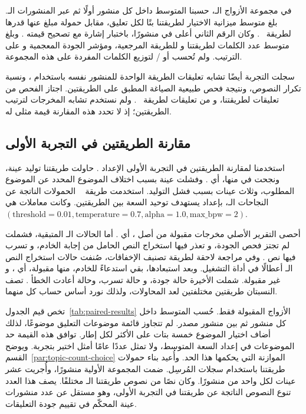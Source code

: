 في مجموعة الأزواج الـ، حسبنا المتوسط داخل كل منشور أولًا ثم عبر المنشورات الـ.
بلغ متوسط ميزانية الاختيار لطريقتنا  بتًا لكل تعليق، مقابل حمولة مبلغ عنها قدرها  لطريقة ~\cite{lin2024zero}.
وكان الرقم الثاني أعلى في  منشورًا، باختبار إشارة مع تصحيح  قيمته .
وبلغ متوسط عدد الكلمات  لطريقتنا و للطريقة المرجعية، ومؤشر الجودة المعجمية  و على الترتيب.
ولم تُحسب  أو / لتوزيع الكلمات المفردة على هذه المجموعة.

سجلت التجربة أيضًا تشابه تعليقات الطريقة الواحدة للمنشور نفسه باستخدام ، ونسبة تكرار النصوص، ونتيجة فحص طبيعية الصياغة المطبق على الطريقتين.
اجتاز الفحص  من  تعليقات لطريقتنا، و من  تعليقات لطريقة ~\cite{lin2024zero}.
ولم نستخدم تشابه المخرجات لترتيب الطريقتين؛ إذ لا تحدد هذه المقارنة قيمة مثلى له.

\subsection{مقارنة الطريقتين في التجربة الأولى}
استخدمنا لمقارنة الطريقتين في التجربة الأولى الإعداد .
حاولت طريقتنا توليد  عينة، ونجحت في  منها، أي .
وفشلت  عينة بسبب اختلاف الموضوع المحدد عن الموضوع المطلوب، وثلاث عينات بسبب فشل التوليد.
استخدمت طريقة ~\cite{lin2024zero} الحمولات الناتجة عن النجاحات الـ، بإعداد يستهدف توحيد السعة بين الطريقتين.
وكانت معاملات  هي $(\text{threshold}=0.01,\text{temperature}=0.7,\text{alpha}=1.0,\text{max\_bpw}=2)$.

أحصى التقرير الأصلي  مخرجات مقبولة من أصل ، أي .
أما الحالات الـ المتبقية، فشملت  لم تجتز فحص الجودة، و تعذر فيها استخراج النص الحامل من إجابة الخادم، و تسرب فيها نص .
وفي مراجعة لاحقة لطريقة تصنيف الإخفاقات، صُنفت حالات استخراج النص الـ أعطالًا في أداة التشغيل.
وبعد استبعادها، بقي  استدعاءً للخادم، منها  مقبولة، أي ، و غير مقبولة.
شملت الأخيرة  حالة جودة، و حالة تسرب، وحالة أعادت الخطأ .
تصف النسبتان طريقتين مختلفتين لعد المحاولات، ولذلك نورد أساس حساب كل منهما.

تخص قيم الجدول~\ref{tab:paired-results} الأزواج المقبولة فقط. حُسب المتوسط داخل كل منشور ثم بين  منشور مصدر.
لم تتجاوز قائمة موضوعات التعليق  موضوعًا، لذلك أضاف اختيار الموضوع خمسة بتات على الأكثر لكل إطار.
توافق هذه القيمة حد الموضوعات في إعداد السعة المتوسط، ولا تمثل عددًا عامًا أمثل اختير بتجربة. ويوضح القسم~\ref{par:topic-count-choice} الموازنة التي يحكمها هذا الحد.
وأُعيد بناء حمولات طريقتنا باستخدام سجلات المُرسِل.
ضمت المجموعة الأولية  منشورًا، وأُجريت عشر عينات لكل واحد من  منشورًا.
وكان  نصًا من نصوص طريقتنا الـ مختلفًا. يصف هذا العدد تنوع النصوص الناتجة عن طريقتنا في التجربة الأولى، وهو مستقل عن عدد منشورات عينة المحكّم في تقييم جودة التعليقات.

